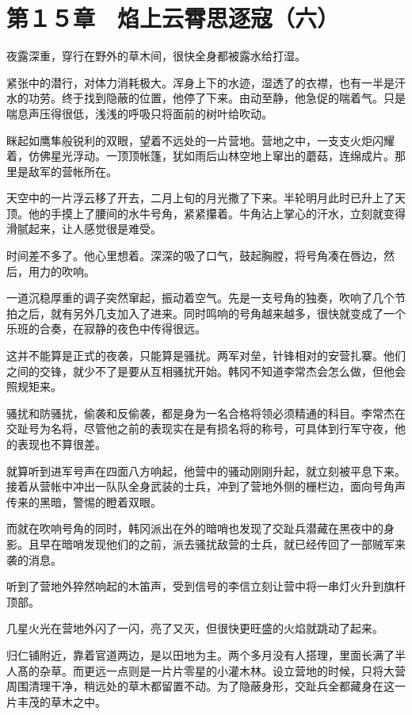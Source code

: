 \section{第１５章　焰上云霄思逐寇（六）}

夜露深重，穿行在野外的草木间，很快全身都被露水给打湿。

紧张中的潜行，对体力消耗极大。浑身上下的水迹，湿透了的衣襟，也有一半是汗水的功劳。终于找到隐蔽的位置，他停了下来。由动至静，他急促的喘着气。只是喘息声压得很低，浅浅的呼吸只将面前的树叶给吹动。

眯起如鹰隼般锐利的双眼，望着不远处的一片营地。营地之中，一支支火炬闪耀着，仿佛星光浮动。一顶顶帐篷，犹如雨后山林空地上窜出的蘑菇，连绵成片。那里是敌军的营帐所在。

天空中的一片浮云移了开去，二月上旬的月光撒了下来。半轮明月此时已升上了天顶。他的手摸上了腰间的水牛号角，紧紧攥着。牛角沾上掌心的汗水，立刻就变得滑腻起来，让人感觉很是难受。

时间差不多了。他心里想着。深深的吸了口气，鼓起胸膛，将号角凑在唇边，然后，用力的吹响。

一道沉稳厚重的调子突然窜起，振动着空气。先是一支号角的独奏，吹响了几个节拍之后，就有另外几支加入了进来。同时鸣响的号角越来越多，很快就变成了一个乐班的合奏，在寂静的夜色中传得很远。

这并不能算是正式的夜袭，只能算是骚扰。两军对垒，针锋相对的安营扎寨。他们之间的交锋，就少不了是要从互相骚扰开始。韩冈不知道李常杰会怎么做，但他会照规矩来。

骚扰和防骚扰，偷袭和反偷袭，都是身为一名合格将领必须精通的科目。李常杰在交趾号为名将，尽管他之前的表现实在是有损名将的称号，可具体到行军守夜，他的表现也不算很差。

就算听到进军号声在四面八方响起，他营中的骚动刚刚升起，就立刻被平息下来。接着从营帐中冲出一队队全身武装的士兵，冲到了营地外侧的栅栏边，面向号角声传来的黑暗，警惕的瞪着双眼。

而就在吹响号角的同时，韩冈派出在外的暗哨也发现了交趾兵潜藏在黑夜中的身影。且早在暗哨发现他们的之前，派去骚扰敌营的士兵，就已经传回了一部贼军来袭的消息。

听到了营地外猝然响起的木笛声，受到信号的李信立刻让营中将一串灯火升到旗杆顶部。

几星火光在营地外闪了一闪，亮了又灭，但很快更旺盛的火焰就跳动了起来。

归仁铺附近，靠着官道两边，是以田地为主。两个多月没有人搭理，里面长满了半人髙的杂草。而更远一点则是一片片零星的小灌木林。设立营地的时候，只将大营周围清理干净，稍远处的草木都留置不动。为了隐蔽身形，交趾兵全都藏身在这一片丰茂的草木之中。

